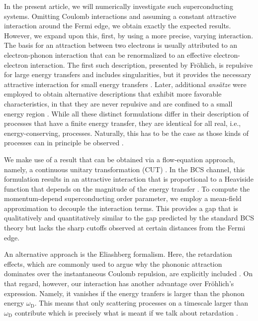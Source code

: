 \documentclass[
    reprint, 
    aps,
    preprintnumbers,
    twocolumn,
    prb,
    superscriptaddress
]{revtex4-2}
\begin{document}
In the present article, we will numerically investigate such superconducting systems.
Omitting Coulomb interactions and assuming a constant attractive interaction around the Fermi edge, we obtain exactly the expected results.
However, we expand upon this, first, by using a more precise, varying interaction.
The basis for an attraction between two electrons is usually attributed to an electron-phonon interaction that can be renormalized to an effective electron-electron interaction.
The first such description, presented by Fr\"ohlich, is repulsive for large energy transfers and includes singularities, but it provides the necessary attractive interaction for small energy transfers \cite{frohlich1997}.
Later, additional \textsl{ans\"atze} were employed to obtain alternative descriptions that exhibit more favorable characteristics, in that they are never repulsive and are confined to a small energy region \cite{lenz1996,mielke1997,mielke1997a,hubsch2003,kehrein2006,krull2012}.
While all these distinct formulations differ in their description of processes that have a finite energy transfer,
they are identical for all real, i.e., energy-conserving, processes.
Naturally, this has to be the case as those kinds of processes can in principle be observed \cite{kehrein2006}.

We make use of a result that can be obtained via a flow-equation approach, namely, a continuous unitary transformation (CUT) \cite{mielke1997,mielke1997a,krull2012,schmiedinghoff2022,walther2023,hering2024}.
In the BCS channel, this formulation results in an attractive interaction that is proportional to a Heaviside function that depends on the magnitude of the energy transfer \cite{krull2012}.
To compute the momentum-depend superconducting order parameter, we employ a mean-field approximation to decouple the interaction terms.
This provides a gap that is qualitatively and quantitatively similar to the gap predicted by the standard BCS theory \cite{bardeen1957,bogoliubov1958} but lacks the sharp cutoffs observed at certain distances from the Fermi edge.

An alternative approach is the Eliashberg formalism.
Here, the retardation effects, which are commonly used to argue why the phononic attraction dominates over the instantaneous Coulomb repulsion, are explicitly included \cite{eliashberg1960,combescot1990,joas2002,chang2007}.
On that regard, however, our interaction has another advantage over Fr\"ohlich's expression.
Namely, it vanishes if the energy tranfers is larger than the phonon energy $\omega_\mathrm{D}$.
This means that only scattering processes on a timescale larger than $\omega_\mathrm{D}$ contribute which is precisely what is meant if we talk about retardation \cite{kehrein2006}.
\end{document}
